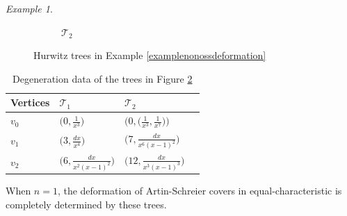 \documentclass{compositio}
\theoremstyle{remark}
\newtheorem{example}[theorem]{Example}
\theoremstyle{remark}
\begin{document}
\begin{example}
\begin{figure}[ht]
\begin{subfigure}{.5\textwidth}
  \caption{$\mathcal{T}_2$}
  \label{figexamplenonossdeformationtree2}
\end{subfigure}%
\caption{Hurwitz trees in Example \ref{examplenonossdeformation}}
\label{figexamplenonossdeformationtrees}
\end{figure}

\begin{table}[ht]
    \centering
\begin{tabular}{ |p{1.8cm}|p{3.7cm}|p{3.7cm}|p{3.7cm}|  }
\hline
Vertices & $\mathcal{T}_1$ & $\mathcal{T}_2$  \\
\hline
\hline
$v_0$ & $\big( 0, \frac{1}{x^{3}} \big)$ & $\big( 0, \big(\frac{1}{x^{3}}, \frac{1}{x^7} \big) \big) $\\
\hline
$v_1$ & $\big( 3, \frac{dx}{x^4} \big)$ & $\big( 7, \frac{dx}{x^{6}(x-1)^{2}} \big)$\\
\hline
$v_2$ & $\big( 6, \frac{dx}{x^{2}(x-1)^{2}} \big)$ & $\big( 12, \frac{dx}{x^{3}(x-1)^{3}} \big)$  \\
\hline
\end{tabular}
    \caption{Degeneration data of the trees in Figure \ref{figexamplenonossdeformationtrees}}
    \label{tab:degenerationdataexamplenonossdeformation}
\end{table}
\end{example}

When $n=1$, the deformation of Artin-Schreier covers in equal-characteristic is completely determined by these trees.
\end{document}
